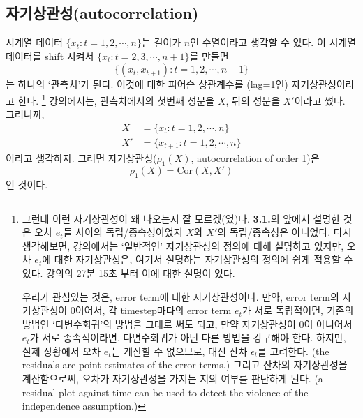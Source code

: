 \documentclass{article}
\begin{document}
\subsection{자기상관성(autocorrelation)}
시계열 데이터 \(\{x_t:t=1,2,\cdots, n\}\)는 길이가 \(n\)인 수열이라고 생각할 수 있다.
이 시계열데이터를 shift 시켜서 \(\{x_t:t=2,3,\cdots, n+1\}\)를 만들면
\[\{(x_t,x_{t+1}):t=1,2,\cdots,n-1\}\]
는 하나의 `관측치'가 된다.
이것에 대한 피어슨 상관계수를 (lag=1인) 자기상관성이라고 한다.
\footnote{그런데 이런 자기상관성이 왜 나오는지 잘 모르겠(었)다.
\textbf{3.1.}의 앞에서 설명한 것은 오차 \(e_t\)들 사이의 독립/종속성이었지 \(X\)와 \(X'\)의 독립/종속성은 아니었다.
다시 생각해보면, 강의에서는 `일반적인' 자기상관성의 정의에 대해 설명하고 있지만, 오차 \(e_t\)에 대한 자기상관성은, 여기서 설명하는 자기상관성의 정의에 쉽게 적용할 수 있다. 강의의 27분 15초 부터 이에 대한 설명이 있다.

우리가 관심있는 것은, error term에 대한 자기상관성이다.
만약, error term의 자기상관성이 0이어서, 각 timestep마다의 error term \(e_t\)가 서로 독립적이면, 기존의 방법인 `다변수회귀'의 방법을 그대로 써도 되고, 만약 자기상관성이 0이 아니어서 \(e_t\)가 서로 종속적이라면, 다변수회귀가 아닌 다른 방법을 강구해야 한다.
하지만, 실제 상황에서 오차 \(e_t\)는 계산할 수 없으므로, 대신 잔차 \(\epsilon_t\)를 고려한다. (the residuals are point estimates of the error terms.)
그리고 잔차의 자기상관성을 계산함으로써, 오차가 자기상관성을 가지는 지의 여부를 판단하게 된다. (a residual plot against time can be used to detect the violence of the independence assumption.)}
강의에서는, 관측치에서의 첫번째 성분을 \(X\), 뒤의 성분을 \(X'\)이라고 썼다.
그러니까, 
\begin{align*}
X&=\{x_t:t=1,2,\cdots,n\}\\
X'&=\{x_{t+1}:t=1,2,\cdots,n\}
\end{align*}
이라고 생각하자.
그러면 자기상관성(\(\rho_1(X)\), autocorrelation of order 1)은\footnotemark
\[\rho_1(X)=\text{Cor}(X,X')\]
인 것이다.
\end{document}
